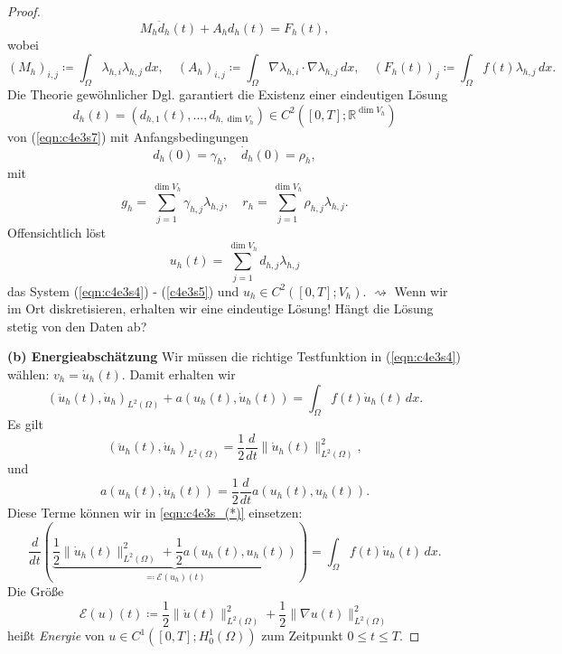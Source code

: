 \documentclass[../skript.tex]{subfiles}
\begin{document}
\begin{proof}
\begin{equation}
		M_h \ddot{d}_h(t) + A_h d_h(t) = F_h(t),
	\end{equation} 
	wobei 
	\[
		(M_h)_{i,j} \coloneqq \int_\Omega \lambda_{h,i}\lambda_{h,j}\,dx,\quad (A_h)_{i,j} \coloneqq \int_\Omega \nabla\lambda_{h,i} \cdot \nabla\lambda_{h,j}\,dx,\quad (F_h(t))_j \coloneqq \int_\Omega f(t)\lambda_{h,j} \,dx.
	\]
	Die Theorie gewöhnlicher Dgl. garantiert die Existenz einer eindeutigen Lösung 
	\[
		d_h(t) = \left( d_{h,1}(t),...,d_{h,\dim{V_h}} \right) \in C^2([0,T];\mathbb{R}^{\dim{V_h}})
	\]
	von (\ref{eqn:c4e3s7}) mit Anfangsbedingungen 
	\begin{equation}\label{eqn:c4e3s8}
		 d_h(0) = \gamma_h,\quad\dot{d}_h(0) = \rho_h,
	\end{equation}
	mit 
	\[
		g_h = \sum_{j=1}^{\dim{V_h}} \gamma_{h,j}\lambda_{h,j},\quad r_h = \sum_{j=1}^{\dim{V_h}}\rho_{h,j}\lambda_{h,j}.
	\]
	Offensichtlich löst
	\[
		u_h(t) = \sum_{j=1}^{\dim{V_h}} d_{h,j}\lambda_{h,j}
	\]
	das System (\ref{eqn:c4e3s4}) - (\ref{c4e3s5}) und $u_h\in C^2([0,T];V_h)$.\newline\newline\noindent
	$\rightsquigarrow$ Wenn wir im Ort diskretisieren, erhalten wir eine eindeutige Lösung!\newline\newline\noindent
	Hängt die Lösung stetig von den Daten ab?\newline\newline\noindent

	\textbf{(b) Energieabschätzung  } Wir müssen die richtige Testfunktion in (\ref{eqn:c4e3s4}) wählen: $v_h = \dot{u}_h(t)$. Damit erhalten wir 
	\begin{equation}
		(\ddot{u}_h(t),\dot{u}_h)_{L^2(\Omega)} + a(u_h(t),\dot{u}_h(t)) = \int_\Omega f(t)\dot{u}_h(t)\,dx.\label{eqn:c4e3s_(*)}\tag{(*)}
	\end{equation}
	Es gilt
	\[
		(\ddot{u}_h(t),\dot{u}_h)_{L^2(\Omega)} = \frac{1}{2}\frac{d}{dt}\|\dot{u}_h(t)\|_{L^2(\Omega)}^2,
	\]
	und
	\[
		a(u_h(t),\dot{u}_h(t)) = \frac{1}{2}\frac{d}{dt} a(u_h(t),u_h(t)).	
	\]
	Diese Terme können wir in \ref{eqn:c4e3s_(*)} einsetzen:
	\[
		\frac{d}{dt}\left( \underbrace{\frac{1}{2}\|\dot{u}_h(t)\|_{L^2(\Omega)}^2 + \frac{1}{2}a(u_h(t), u_h(t))}_{\eqqcolon\mathcal{E}(u_h)(t)} \right) = \int_\Omega f(t)\dot{u}_h(t)\,dx.
	\]
	Die Größe
	\[
		\mathcal{E}(u)(t) \coloneqq \frac{1}{2}\|\dot{u}(t)\|_{L^2(\Omega)}^2 + \frac{1}{2}\|\nabla u(t)\|_{L^2(\Omega)}^2
	\]
	heißt \emph{Energie} von $u\in C^1([0,T];H^1_0(\Omega))$ zum Zeitpunkt $0\leq t\leq T$.


\end{proof}
\end{document}

